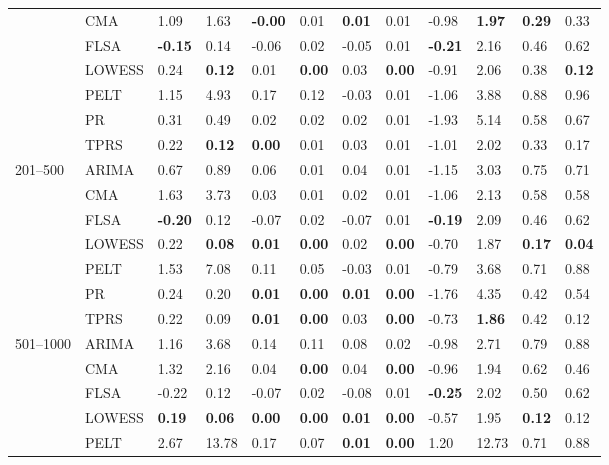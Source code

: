 \begin{table}[ht]
\begin{tabular}{llllllllllll}
   & CMA & 1.09 & 1.63 & \textbf{-0.00} & 0.01 & \textbf{0.01} & 0.01 & -0.98 & \textbf{1.97} & \textbf{0.29} & 0.33 \\ 
   & FLSA & \textbf{-0.15} & 0.14 & -0.06 & 0.02 & -0.05 & 0.01 & \textbf{-0.21} & 2.16 & 0.46 & 0.62 \\ 
   & LOWESS & 0.24 & \textbf{0.12} & 0.01 & \textbf{0.00} & 0.03 & \textbf{0.00} & -0.91 & 2.06 & 0.38 & \textbf{0.12} \\ 
   & PELT & 1.15 & 4.93 & 0.17 & 0.12 & -0.03 & 0.01 & -1.06 & 3.88 & 0.88 & 0.96 \\ 
   & PR & 0.31 & 0.49 & 0.02 & 0.02 & 0.02 & 0.01 & -1.93 & 5.14 & 0.58 & 0.67 \\ 
   & TPRS & 0.22 & \textbf{0.12} & \textbf{0.00} & 0.01 & 0.03 & 0.01 & -1.01 & 2.02 & 0.33 & 0.17 \\ 
  201–500 & ARIMA & 0.67 & 0.89 & 0.06 & 0.01 & 0.04 & 0.01 & -1.15 & 3.03 & 0.75 & 0.71 \\ 
   & CMA & 1.63 & 3.73 & 0.03 & 0.01 & 0.02 & 0.01 & -1.06 & 2.13 & 0.58 & 0.58 \\ 
   & FLSA & \textbf{-0.20} & 0.12 & -0.07 & 0.02 & -0.07 & 0.01 & \textbf{-0.19} & 2.09 & 0.46 & 0.62 \\ 
   & LOWESS & 0.22 & \textbf{0.08} & \textbf{0.01} & \textbf{0.00} & 0.02 & \textbf{0.00} & -0.70 & 1.87 & \textbf{0.17} & \textbf{0.04} \\ 
   & PELT & 1.53 & 7.08 & 0.11 & 0.05 & -0.03 & 0.01 & -0.79 & 3.68 & 0.71 & 0.88 \\ 
   & PR & 0.24 & 0.20 & \textbf{0.01} & \textbf{0.00} & \textbf{0.01} & \textbf{0.00} & -1.76 & 4.35 & 0.42 & 0.54 \\ 
   & TPRS & 0.22 & 0.09 & \textbf{0.01} & \textbf{0.00} & 0.03 & \textbf{0.00} & -0.73 & \textbf{1.86} & 0.42 & 0.12 \\ 
  501–1000 & ARIMA & 1.16 & 3.68 & 0.14 & 0.11 & 0.08 & 0.02 & -0.98 & 2.71 & 0.79 & 0.88 \\ 
   & CMA & 1.32 & 2.16 & 0.04 & \textbf{0.00} & 0.04 & \textbf{0.00} & -0.96 & 1.94 & 0.62 & 0.46 \\ 
   & FLSA & -0.22 & 0.12 & -0.07 & 0.02 & -0.08 & 0.01 & \textbf{-0.25} & 2.02 & 0.50 & 0.62 \\ 
   & LOWESS & \textbf{0.19} & \textbf{0.06} & \textbf{0.00} & \textbf{0.00} & \textbf{0.01} & \textbf{0.00} & -0.57 & 1.95 & \textbf{0.12} & 0.12 \\ 
   & PELT & 2.67 & 13.78 & 0.17 & 0.07 & \textbf{0.01} & \textbf{0.00} & 1.20 & 12.73 & 0.71 & 0.88 \\ 

\end{tabular}
\end{table}

